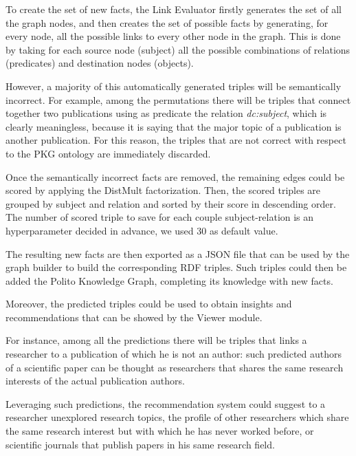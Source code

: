 \documentclass[%
    corpo=13.5pt,
    twoside,
    oldstyle,
    tipotesi=magistrale,
    greek,
    evenboxes
]{toptesi}
\begin{document}
To create the set of new facts, the Link Evaluator firstly
generates the set of all the graph nodes, and then creates the set of
possible facts by generating, for every node, all the possible links to
every other node in the graph. This is done by taking for each source node
(subject) all the possible combinations of relations (predicates) and
destination nodes (objects).

However, a majority of this automatically generated triples will be semantically
incorrect. For example, among the permutations there will be triples that
connect together two publications using as predicate the relation
\emph{dc:subject}, which is clearly meaningless, because it is saying that the
major topic of a publication is another publication.
For this reason, the triples that are not correct with respect to the PKG
ontology are immediately discarded.

Once the semantically incorrect facts are removed, the remaining edges could be
scored by applying the DistMult factorization.
Then, the scored triples are grouped by subject and relation and sorted by their
score in descending order.
The number of scored triple to save for each couple subject-relation is an
hyperparameter decided in advance, we used 30 as default value.

The resulting new facts are then exported as a JSON file that can be used by
the graph builder to build the corresponding RDF triples.
Such triples could then be added the Polito Knowledge Graph, completing its
knowledge with new facts.

Moreover, the predicted triples could be used to obtain insights and
recommendations that can be showed by the Viewer module.

For instance, among all the predictions there will be triples that links a
researcher to a publication of which he is not an author: such predicted
authors of a scientific paper can be thought as researchers that
shares the same research interests of the actual publication authors.

Leveraging such predictions, the recommendation system could suggest to
a researcher unexplored research topics, the profile of other researchers which
share the same research interest but with which he has never worked before, or
scientific journals that publish papers in his same research field.



\end{document}
